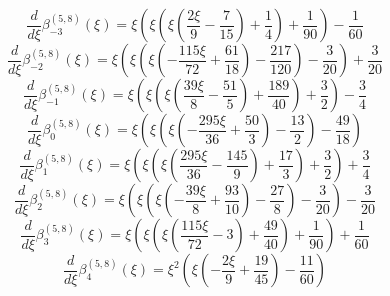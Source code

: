 
\begin{equation}
\frac{d}{d\xi}\beta_{-3}^{(5,8)} (\xi) =
 \xi \left(\xi \left(\xi \left(\frac{2 \xi}{9}
 - \frac{7}{15}\right) + \frac{1}{4}\right) + \frac{1}{90}\right) - \frac{1}{60}
\end{equation}
\begin{equation}
\frac{d}{d\xi}\beta_{-2}^{(5,8)} (\xi) =
 \xi \left(\xi \left(\xi \left(- \frac{115 \xi}{72}
 + \frac{61}{18}\right) - \frac{217}{120}\right) - \frac{3}{20}\right) + \frac{3}{20}
\end{equation}
\begin{equation}
\frac{d}{d\xi}\beta_{-1}^{(5,8)} (\xi) =
 \xi \left(\xi \left(\xi \left(\frac{39 \xi}{8}
 - \frac{51}{5}\right) + \frac{189}{40}\right) + \frac{3}{2}\right) - \frac{3}{4}
\end{equation}
\begin{equation}
\frac{d}{d\xi}\beta_{0}^{(5,8)} (\xi) =
 \xi \left(\xi \left(\xi \left(- \frac{295 \xi}{36} + \frac{50}{3}\right) - \frac{13}{2}\right) - \frac{49}{18}\right)
\end{equation}
\begin{equation}
\frac{d}{d\xi}\beta_{1}^{(5,8)} (\xi) =
 \xi \left(\xi \left(\xi \left(\frac{295 \xi}{36}
 - \frac{145}{9}\right) + \frac{17}{3}\right) + \frac{3}{2}\right) + \frac{3}{4}
\end{equation}
\begin{equation}
\frac{d}{d\xi}\beta_{2}^{(5,8)} (\xi) =
 \xi \left(\xi \left(\xi \left(- \frac{39 \xi}{8}
 + \frac{93}{10}\right) - \frac{27}{8}\right) - \frac{3}{20}\right) - \frac{3}{20}
\end{equation}
\begin{equation}
\frac{d}{d\xi}\beta_{3}^{(5,8)} (\xi) =
 \xi \left(\xi \left(\xi \left(\frac{115 \xi}{72} - 3\right) + \frac{49}{40}\right) + \frac{1}{90}\right) + \frac{1}{60}
\end{equation}
\begin{equation}
\frac{d}{d\xi}\beta_{4}^{(5,8)} (\xi) =
 \xi^{2} \left(\xi \left(- \frac{2 \xi}{9} + \frac{19}{45}\right) - \frac{11}{60}\right)
\end{equation}
